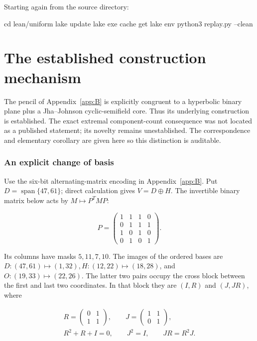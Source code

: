 \documentclass[11pt,a4paper]{article}
\theoremstyle{definition}
\begin{document}
Starting again from the source directory:


\begin{Code}
cd lean/uniform
lake update
lake exe cache get
lake env python3 replay.py --clean
\end{Code}

\section{The established construction mechanism}\label{app:E}

The pencil of Appendix~\ref{app:B} is explicitly congruent to a hyperbolic binary plane plus a Jha--Johnson cyclic-semifield core. Thus its underlying construction is established. The exact extremal component-count consequence was not located as a published statement; its novelty remains unestablished. The correspondence and elementary corollary are given here so this distinction is auditable.


\subsubsection*{An explicit change of basis}

Use the six-bit alternating-matrix encoding in Appendix~\ref{app:B}. Put $D=\operatorname{span}\{47,61\}$; direct calculation gives $V=D\oplus H$. The invertible binary matrix below acts by $M\mapsto P^{T}MP$:


\begin{equation}\label{eq:177}
P=\begin{pmatrix}1&1&1&0\\0&1&1&1\\1&0&1&0\\0&1&0&1\end{pmatrix}.
\end{equation}

Its columns have masks $5,11,7,10$. The images of the ordered bases are $D:(47,61)\mapsto (1,32), H:(12,22)\mapsto (18,28)$, and $O:(19,33)\mapsto (22,26)$. The latter two pairs occupy the cross block between the first and last two coordinates. In that block they are $(I,R)$ and $(J,JR)$, where


\begin{equation}\label{eq:179}
\begin{gathered}R=\begin{pmatrix}0&1\\1&1\end{pmatrix},\qquad J=\begin{pmatrix}1&1\\0&1\end{pmatrix},\\R^2+R+I=0,\qquad J^2=I,\qquad JR=R^2J.\end{gathered}
\end{equation}
\end{document}
